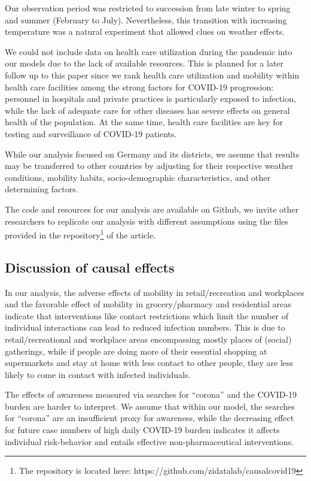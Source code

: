 \documentclass[]{elsarticle} %
\begin{document}
Our observation period was restricted to succession from late winter to spring and summer (February to July). Nevertheless, this transition with increasing temperature was a natural experiment that allowed clues on weather effects.

We could not include data on health care utilization during the pandemic into our models due to the lack of available resources. This is planned for a later follow up to this paper since we rank health care utilization and mobility within health care facilities among the strong factors for COVID-19 progression: personnel in hospitals and private practices is particularly exposed to infection, while the lack of adequate care for other diseases has severe effects on general health of the population. At the same time, health care facilities are key for testing and surveillance of COVID-19 patients.

While our analysis focused on Germany and its districts, we assume that results may be transferred to other countries by adjusting for their respective weather conditions, mobility habits, socio-demographic characteristics, and other determining factors.

The code and resources for our analysis are available on Github, we invite other researchers to replicate our analysis with different assumptions using the files provided in the repository\footnote{The repository is located here: https://github.com/zidatalab/causalcovid19} of the article.

\hypertarget{discussion-of-causal-effects}{%
\subsection{Discussion of causal effects}\label{discussion-of-causal-effects}}

In our analysis, the adverse effects of mobility in retail/recreation and workplaces and the favorable effect of mobility in grocery/pharmacy and residential areas indicate that interventions like contact restrictions which limit the number of individual interactions can lead to reduced infection numbers. This is due to retail/recreational and workplace areas encompassing mostly places of (social) gatherings, while if people are doing more of their essential shopping at supermarkets and stay at home with less contact to other people, they are less likely to come in contact with infected individuals.

The effects of awareness measured via searches for ``corona'' and the COVID-19 burden are harder to interpret. We assume that within our model, the searches for ``corona'' are an insufficient proxy for awareness, while the decreasing effect for future case numbers of high daily COVID-19 burden indicates it affects individual risk-behavior and entails effective non-pharmaceutical interventions.
\end{document}
